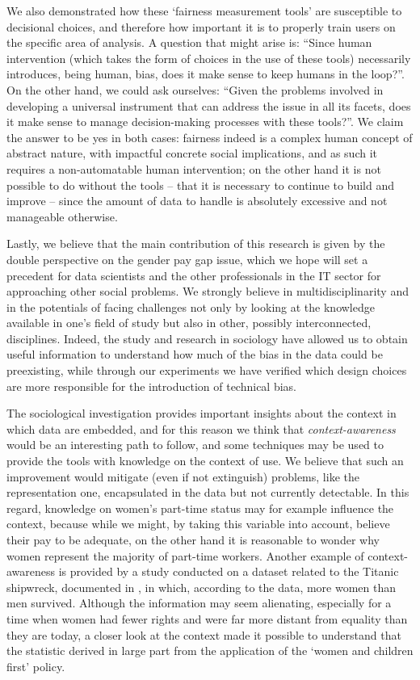 We also demonstrated how these `fairness measurement tools' are susceptible to decisional choices, and therefore how important it is to properly train users on the specific area of analysis. A question that might arise is: ``Since human intervention (which takes the form of choices in the use of these tools) necessarily introduces, being human, bias, does it make sense to keep humans in the loop?''. On the other hand, we could ask ourselves: ``Given the problems involved in developing a universal instrument that can address the issue in all its facets, does it make sense to manage decision-making processes with these tools?''. We claim the answer to be yes in both cases: fairness indeed is a complex human concept of abstract nature, with impactful concrete social implications, and as such it requires a non-automatable human intervention; on the other hand it is not possible to do without the tools -- that it is necessary to continue to build and improve -- since the amount of data to handle is absolutely excessive and not manageable otherwise.

Lastly, we believe that the main contribution of this research is given by the double perspective on the gender pay gap issue, which we hope will set a precedent for data scientists and the other professionals in the IT sector for approaching other social problems. We strongly believe in multidisciplinarity and in the potentials of facing challenges not only by looking at the knowledge available in one's field of study but also in other, possibly interconnected, disciplines. Indeed, the study and research in sociology have allowed us to obtain useful information to understand how much of the bias in the data could be preexisting, while through our experiments we have verified which design choices are more responsible for the introduction of technical bias.

The sociological investigation provides important insights about the context in which data are embedded, and for this reason we think that \textit{context-awareness} would be an interesting path to follow, and some techniques may be used to provide the tools with knowledge on the context of use. We believe that such an improvement would mitigate (even if not extinguish) problems, like the representation one, encapsulated in the data but not currently detectable. In this regard, knowledge on women's part-time status may for example influence the context, because while we might, by taking this variable into account, believe their pay to be adequate, on the other hand it is reasonable to wonder why women represent the majority of part-time workers. Another example of context-awareness is provided by a study conducted on a dataset related to the Titanic shipwreck, documented in \cite{azzalini2021fair}, in which, according to the data, more women than men survived. Although the information may seem alienating, especially for a time when women had fewer rights and were far more distant from equality than they are today, a closer look at the context made it possible to understand that the statistic derived in large part from the application of the `women and children first' policy.

